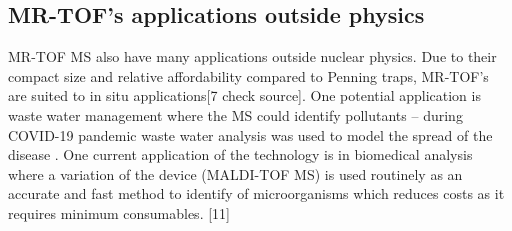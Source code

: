 \subsection{MR-TOF's applications outside physics}
MR-TOF MS also have many applications outside nuclear physics.
Due to their compact size and relative affordability compared to Penning traps, MR-TOF's are suited to in situ applications[7 check source].
One potential application is waste water management where the MS could identify pollutants \cite{dickel_multiple-reflection_2013} – during COVID-19 pandemic waste water analysis was used to model the spread of the disease \cite{noauthor_wastewater_nodate}.
One current application of the technology is in biomedical analysis where a variation of the device (MALDI-TOF MS) is used routinely as an accurate and fast method to identify of microorganisms which reduces costs as it requires minimum consumables. [11]